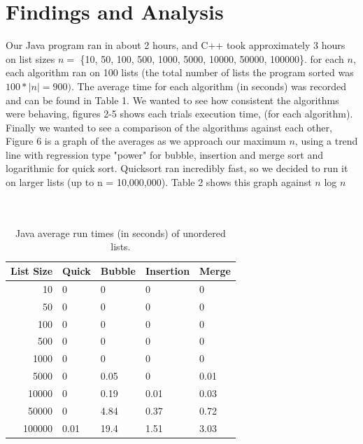 \documentclass[12pt]{amsart}
\begin{document}
\section*{Findings and Analysis}
Our Java program ran in about 2 hours, and C++ took approximately 3 hours on list sizes $n = $ \{10, 50, 100, 500, 1000, 5000, 10000, 50000, 100000\}. for each $n$, each algorithm ran on 100 lists (the total number of lists the program sorted was $100 * |n| = 900)$. The average time for each algorithm (in seconds) was recorded and can be found in Table 1. We wanted to see how consistent the algorithms were behaving, figures 2-5 shows each trials execution time, (for each algorithm). Finally we wanted to see a comparison of the algorithms against each other, Figure 6 is a graph of the averages as we approach our maximum $n$, using a trend line with regression type "power" for bubble, insertion and merge sort and logarithmic for quick sort. Quicksort ran incredibly fast, so we decided to run it on larger lists (up to n = 10,000,000). Table 2 shows this graph against $n$ log $n$
\\ \\ \\
\begin{table}\footnotesize
\begin{center}
\begin{tabular}{ r | l l l l  }

List Size	&	Quick	&	Bubble	&	Insertion	&	Merge\\ \hline
10			&	0		&	0		&	0			&	0\\
50			&	0		&	0		&	0			&	0\\
100			&	0		&	0		&	0			&	0\\
500			&	0		&	0		&	0			&	0\\
1000			&	0		&	0		&	0			&	0\\
5000			&	0		&	0.05		&	0			&	0.01\\
10000		&	0		&	0.19		&	0.01			&	0.03\\
50000		&	0		&	4.84		&	0.37			&	0.72\\
100000		&	0.01		&	19.4		&	1.51			&	3.03\\

\end{tabular}
\end{center}
\caption{Java average run times (in seconds) of unordered lists.}
\end{table}
\end{document}
